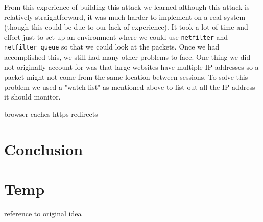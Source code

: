 \documentclass{article}
\begin{document}
From this experience of building this attack we learned although this attack is relatively straightforward, it was much harder to implement on a real system (though this could be due to our lack of experience). It took a lot of time and effort just to set up an environment where we could use \texttt{netfilter} and \texttt{netfilter\_queue} so that we could look at the packets. Once we had accomplished this, we still had many other problems to face. One thing we did not originally account for was that large websites have multiple IP addresses so a packet might not come from the same location between sessions. To solve this problem we used a "watch list" as mentioned above to list out all the IP address it should monitor.

browser caches https redirects
\section{Conclusion}

\section{Temp}

reference to original idea\cite{offpath}



\end{document}
